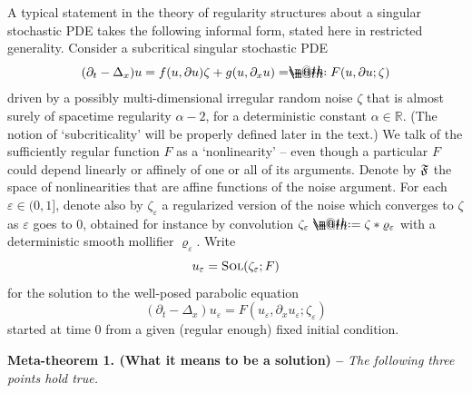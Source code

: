 \documentclass[10pt, reqno]{amsart}
\makeatletter
\numberwithin{subsection}{section}
\numberwithin{subsubsection}{subsection}
\numberwithin{equation}{section} %
\theoremstyle{mystyle}
\theoremstyle{mystyle2}
\theoremstyle{mystyle3}
\newcommand{\ssk}{\smallskip}
\renewcommand{\epsilon}{\varepsilon}
\newcommand\bbR{\mathbb{R}}
\newcommand*{\defeq}{\mathrel{\rlap{%
                     \raisebox{0.3ex}{$\m@th\cdot$}}%
                     \raisebox{-0.3ex}{$\m@th\cdot$}}%
                     =}
\newcommand*{\eqdef}{=\mathrel{\rlap{%
                     \raisebox{0.3ex}{$\m@th\cdot$}}%
                     \raisebox{-0.3ex}{$\m@th\cdot$}}%
                     }
\makeatother
\begin{document}
\ssk

A typical statement in the theory of regularity structures \cite{Hai14, BHZ, ChandraHairer, BCCH18} about a singular stochastic PDE takes the following informal form, stated here in restricted generality. Consider a subcritical singular stochastic PDE
\begin{equation} \label{EqGenericPDE}
(\partial_t-\Delta_x)u = f(u,\partial u)\zeta + g(u,\partial_x u) \eqdef F(u,\partial u; \zeta)
\end{equation}
driven by a possibly multi-dimensional irregular random noise $\zeta$ that is almost surely of spacetime regularity $\alpha-2$, for a deterministic constant $\alpha\in\bbR$. (The notion of `subcriticality' will be properly defined later in the text.) We talk of the sufficiently regular function $F$ as a `nonlinearity' -- even though a particular $F$ could depend linearly or affinely of one or all of its arguments. Denote by $\frak{F}$ 
the space of nonlinearities that are affine functions of the noise argument. For each $\varepsilon\in(0,1]$, denote also by $\zeta_\epsilon$ a regularized version of the noise which converges to $\zeta$ as $\varepsilon$ goes to $0$, obtained for instance by convolution $\zeta_\epsilon\defeq \zeta*\varrho_\varepsilon$ with a deterministic smooth mollifier $\varrho_\varepsilon$. Write 
$$
u_\varepsilon=\textsc{Sol}(\zeta_\epsilon ; F)
$$ 
for the solution to the well-posed parabolic equation 
$$
(\partial_t-\Delta_x)u_\varepsilon = F(u_\varepsilon,\partial_x u_\varepsilon; \zeta_\epsilon)
$$
started at time $0$ from a given (regular enough) fixed initial condition.

\medskip

\noindent \textbf{\textsf{Meta-theorem 1. (What it means to be a solution) --}} \emph{The following three points hold true.}\vspace{0.1cm}
\end{document}
